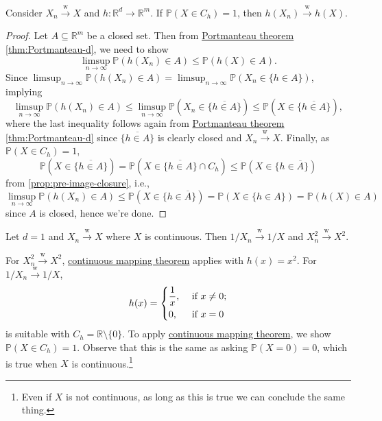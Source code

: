 \begin{theorem}\label{thm:continuous-mapping}
	Consider \(X_n \overset{\text{w} }{\to } X\) and \(h \colon \mathbb{R} ^d \to \mathbb{R} ^m\). If \(\mathbb{P} (X \in C_h) = 1\), then \(h(X_n) \overset{\text{w} }{\to } h(X)\).
\end{theorem}
\begin{proof}
	Let \(A \subseteq \mathbb{R} ^m\) be a closed set. Then from \hyperref[thm:Portmanteau]{Portmanteau theorem} \autoref{thm:Portmanteau-d}, we need to show
	\[
		\limsup_{n \to \infty} \mathbb{P} (h(X_n) \in A)
		\leq \mathbb{P} (h(X) \in A).
	\]
	Since \(\limsup_{n \to \infty} \mathbb{P} (h(X_n) \in A) = \limsup_{n \to \infty} \mathbb{P} (X_n \in \{ h \in A \} )\), implying
	\[
		\limsup_{n \to \infty} \mathbb{P} (h(X_n) \in A)
		\leq \limsup_{n \to \infty} \mathbb{P} (X_n \in \overline{\{ h \in A \}} )
		\leq \mathbb{P} (X \in \overline{\{ h \in A \} }),
	\]
	where the last inequality follows again from \hyperref[thm:Portmanteau]{Portmanteau theorem} \autoref{thm:Portmanteau-d} since \(\overline{\{ h \in A \} }\) is clearly closed and \(X_n \overset{\text{w} }{\to } X\). Finally, as \(\mathbb{P} (X \in C_h) = 1\),
	\[
		\mathbb{P} (X \in \overline{\{ h \in A \} })
		= \mathbb{P} (X \in \overline{\{ h \in A \} } \cap C_h)
		\leq \mathbb{P} (X \in \{ h \in \overline{A} \} )
	\]
	from \autoref{prop:pre-image-closure}, i.e.,
	\[
		\limsup_{n \to \infty} \mathbb{P} (h(X_n) \in A)
		\leq \mathbb{P} (X \in \{ h \in \overline{A} \} )
		= \mathbb{P} (X \in \{ h \in A \} )
		= \mathbb{P} (h(X) \in A)
	\]
	since \(A\) is closed, hence we're done.
\end{proof}

\begin{eg}
	Let \(d = 1\) and \(X_n \overset{\text{w} }{\to } X\) where \(X\) is continuous. Then \(1 / X_n \overset{\text{w} }{\to } 1 / X\) and \(X_n^2 \overset{\text{w} }{\to } X^2\).
\end{eg}
\begin{explanation}
	For \(X_n^2 \overset{\text{w} }{\to } X^2\), \hyperref[thm:continuous-mapping]{continuous mapping theorem} applies with \(h(x) = x^2\). For \(1 / X_n \overset{\text{w} }{\to } 1 / X\),
	\[
		h(x) = \begin{dcases}
			\frac{1}{x}, & \text{ if } x \neq 0 ; \\
			0,           & \text{ if } x = 0
		\end{dcases}
	\]
	is suitable with \(C_h = \mathbb{R} \setminus \{ 0 \} \). To apply \hyperref[thm:continuous-mapping]{continuous mapping theorem}, we show \(\mathbb{P} (X \in C_h) = 1 \). Observe that this is the same as asking \(\mathbb{P} (X = 0) = 0\), which is true when \(X\) is continuous.\footnote{Even if \(X\) is not continuous, as long as this is true we can conclude the same thing.}
\end{explanation}

